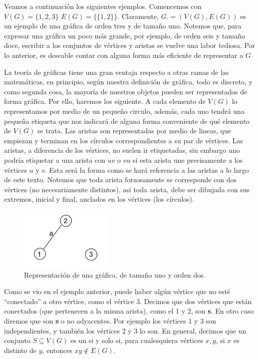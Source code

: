 Veamos a continuación los siguientes ejemplos. Comencemos con $V(G)=\{1,2,3\}$
$E(G)=\{ \{1,2\} \}$. Claramente, $G. = (V(G), E(G))$ es un ejemplo de una
gráfica de orden tres y de tamaño uno.   Notemos que, para expresar una
gr\'afica un poco m\'as grande, por ejemplo, de orden seis y tama\~no doce,
escribir a los conjuntos de v\'ertices y aristas se vuelve una labor tediosa.
Por lo anterior, es deseable contar con alguna forma m\'as eficiente de
representar a $G$

    
La teoría de gráficas tiene una gran ventaja respecto a otras ramas de las
matemáticas, en principio, según nuestra definición de gráfica, todo es
discreto, y como segunda cosa, la mayoría de nuestros objetos pueden ser
representados de forma gráfica. Por ello, haremos los siguiente.  A cada
elemento de $V(G)$ lo representamos por medio de un pequeño circulo, adem\'as,
cada uno tendrá una pequeña etiqueta que nos indicará de alguna forma
conveniente de qué elemento de $V(G)$ se trata. Las aristas son representadas
por medio de lineas, que empiezan y terminan en los círculos correspondientes a
su par de vértices. Las aristas, a diferencia de los vértices, no suelen ir
etiquetadas, sin embargo uno podría etiquetar a una arista con $uv$ o $vu$ si
esta arista une precisamente a los vértices $u$ y $v$. Esta será la forma como
se hará referencia a las aristas a lo largo de este texto. Notemos que toda
arista forzosamente se corresponde con dos vértices (no necesariamente
distintos), así toda arista, debe ser dibujada con sus extremos, inicial y
final, anclados en los vértices (los círculos).

\begin{figure}[H]
  \centering
  \includegraphics[width=0.4\textwidth]{recursos/capturas/01(1).jpg}
  \caption{Representación de una gráfica, de tamaño uno y orden dos.}
  \label{fig:01}
\end{figure}

Como se vio en el ejemplo anterior, puede haber algún vértice que no esté
``conectado'' a otro vértice, como el vértice 3. Decimos que dos vértices que
est\'an conectados (que pertenecen a la misma arista), como el 1 y 2, son
\textbf{s}. En otro caso diremos que son
\textbf{s} o no adyacentes. Por ejemplo los
v\'ertices 1 y 3 son independientes, y tambi\'en los v\'ertices 2 y 3 lo son. En
general, decimos que un conjunto $S\subseteq V(G)$ es  un
 si y solo si, para cualesquiera v\' ertices
$x,y$, si $x$ es distinto de $y$, entonces $xy\notin E(G)$.


